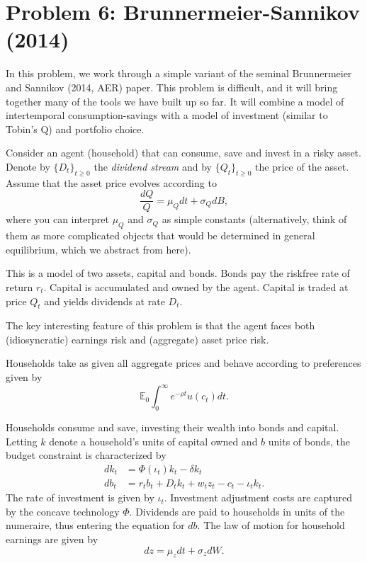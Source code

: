 \documentclass[11pt]{extarticle}
\theoremstyle{plain}
\theoremstyle{definition}
\begin{document}
\vspace{5mm}
\section*{Problem 6: Brunnermeier-Sannikov (2014)}

In this problem, we work through a simple variant of the seminal Brunnermeier and Sannikov (2014, AER) paper. This problem is difficult, and it will bring together many of the tools we have built up so far. It will combine a model of intertemporal consumption-savings with a model of investment (similar to Tobin's Q) and portfolio choice.


Consider an agent (household) that can consume, save and invest in a risky asset. Denote by $\{ D_t \}_{t \geq 0}$ the \textit{dividend stream} and by $\{ Q_t \}_{t \geq 0}$ the price of the asset. Assume that the asset price evolves according to 
\begin{equation*}
	\frac{ dQ }{Q} = \mu_Q dt + \sigma_Q dB,
\end{equation*}
where you can interpret $\mu_Q$ and $\sigma_Q$ as simple constants (alternatively, think of them as more complicated objects that would be determined in general equilibrium, which we abstract from here).


This is a model of two assets, capital and bonds. Bonds pay the riskfree rate of return $r_t$. Capital is accumulated and owned by the agent. Capital is traded at price $Q_t$ and yields dividends at rate $D_t$.

The key interesting feature of this problem is that the agent faces both (idiosyncratic) earnings risk and (aggregate) asset price risk.

Households take as given all aggregate prices and behave according to preferences given by
\begin{equation*}
	\mathbb{E}_0 \int_0^\infty e^{- \rho t} u(c_t) dt.
\end{equation*}

Households consume and save, investing their wealth into bonds and capital. Letting $k$ denote a household's units of capital owned and $b$ units of bonds, the budget constraint is characterized by
\begin{align*}
	dk_t &= \Phi(\iota_t) k_t - \delta k_t \\
	db_t &= r_t b_t + D_t k_t + w_t z_t - c_t -  \iota_t k_t.
\end{align*}
The rate of investment is given by $\iota_t$. Investment adjustment costs are captured by the concave technology $\Phi$. Dividends are paid to households in units of the numeraire, thus entering the equation for $db$. The law of motion for household earnings are given by
\begin{equation*}
	dz = \mu_z dt + \sigma_z dW. 
\end{equation*}
\end{document}
